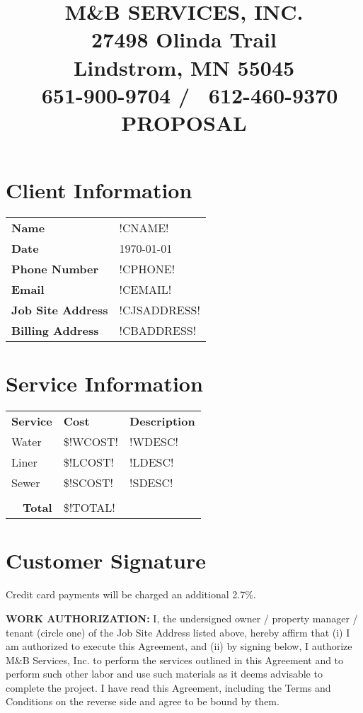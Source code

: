 \documentclass{article}
\title{\textbf{M\&B SERVICES, INC.}\\
    \large 27498 Olinda Trail \\
    Lindstrom, MN 55045 \\
    \Telefon\ 651-900-9704 / \fax\ 612-460-9370 \\ 
    \vspace{10pt}
    \textbf{PROPOSAL}}
\author{}
\date{}
\begin{document}
\maketitle

\vspace{-2cm}

\section*{Client Information}

\begin{tabularx}{\textwidth}{p{100px} X}
    \textbf{Name} & !CNAME! \\
    \textbf{Date} & \today \\
    \textbf{Phone Number} & !CPHONE! \\
    \textbf{Email} & !CEMAIL! \\
    \textbf{Job Site Address} & !CJSADDRESS! \\
    \textbf{Billing Address} & !CBADDRESS! \\
\end{tabularx}

\section*{Service Information}

\begin{tabularx}{\textwidth}{p{50px} p{50px} X}
    \textbf{Service} & \textbf{Cost} & \textbf{Description} \\
     Water & \$!WCOST! & !WDESC! \\
     Liner & \$!LCOST! & !LDESC! \\
     Sewer & \$!SCOST! & !SDESC!  \\
     \hline \\
     \multicolumn{1}{r}{\textbf{Total}} & \$!TOTAL! \\
\end{tabularx}

\section*{Customer Signature}
Credit card payments will be charged an additional 2.7\%.
\vspace{10pt}

\noindent \textbf{WORK AUTHORIZATION:} I, the undersigned owner / property manager / tenant (circle one) of the Job Site Address listed above, hereby affirm that (i) I am authorized to execute this Agreement, and (ii) by signing below, I authorize M\&B Services, Inc. to perform the services outlined in this Agreement and to perform such other labor and use such materials as it deems advisable to complete the project. I have read this Agreement, including the Terms and Conditions on the reverse side and agree to be bound by them.
\vspace{10pt}
\end{document}
